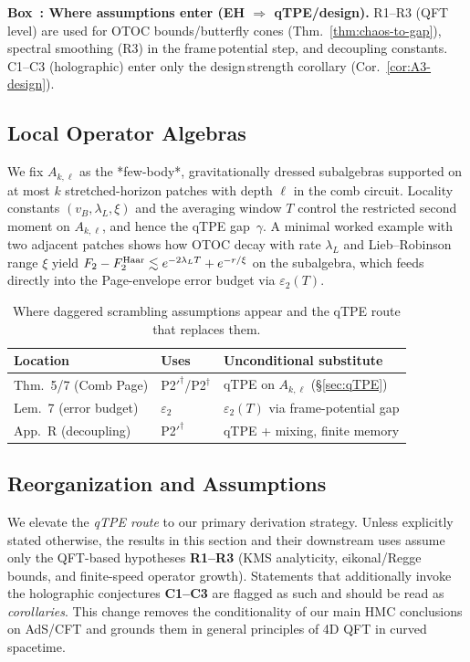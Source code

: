 \documentclass[aps,prd,preprint,onecolumn,superscriptaddress,nofootinbib,longbibliography,floatfix,11pt,showpacs,showkeys]{revtex4-2}
\newcounter{boxedresult}
\newenvironment{boxedresult}[1]{\refstepcounter{boxedresult}\begin{infobox}\noindent\textbf{Box~\theboxedresult: #1.}}{\end{infobox}}
\theoremstyle{plain}
\theoremstyle{definition}
\theoremstyle{remark}
\begin{document}
\begin{boxedresult}{Where assumptions enter (EH $\Rightarrow$ qTPE/design)}\small
R1--R3 (QFT\,level) are used for OTOC bounds/butterfly cones (Thm.~\ref{thm:chaos-to-gap}), spectral smoothing (R3) in the frame\,potential step, and decoupling constants. C1--C3 (holographic) enter only the design\,strength corollary (Cor.~\ref{cor:A3-design}).
\end{boxedresult}

\subsection{Local Operator Algebras}
We fix $A_{k,\ell}$ as the *few-body*, gravitationally dressed subalgebras supported on at
most $k$ stretched-horizon patches with depth $\ell$ in the comb circuit. Locality constants
$(v_B,\lambda_L,\xi)$ and the averaging window $T$ control the restricted second moment on
$A_{k,\ell}$, and hence the qTPE gap~$\gamma$. A minimal worked example with two adjacent
patches shows how OTOC decay with rate $\lambda_L$ and Lieb–Robinson range $\xi$ yield
$F_2- F^{\rm Haar}_2 \lesssim e^{-2\lambda_L T}+e^{-r/\xi}$ on the subalgebra, which feeds
directly into the Page-envelope error budget via $\varepsilon_2(T)$.

\begin{table}[t]
  \centering
  \small
  \begin{tabular}{l l l}
    \hline
    Location & Uses & Unconditional substitute \\
    \hline
    Thm.~5/7 (Comb Page) & P2$'^{\dagger}$/P2$^{\dagger}$ & qTPE on $A_{k,\ell}$ (\S\ref{sec:qTPE}) \\
    Lem.~7 (error budget) & $\varepsilon_2$ & $\varepsilon_2(T)$ via frame-potential gap \\
    App.~R (decoupling) & P2$'^{\dagger}$ & qTPE + mixing, finite memory \\
    \hline
  \end{tabular}
  \caption{Where daggered scrambling assumptions appear and the qTPE route that replaces them.}
  \label{tab:dagger-map}
\end{table}

\subsection{Reorganization and Assumptions}
We elevate the \emph{qTPE route} to our primary derivation strategy.
Unless explicitly stated otherwise, the results in this section and their downstream uses assume only the QFT-based hypotheses \textbf{R1--R3} (KMS analyticity, eikonal/Regge bounds, and finite-speed operator growth).
Statements that additionally invoke the holographic conjectures \textbf{C1--C3} are flagged as such and should be read as \emph{corollaries}.
This change removes the conditionality of our main HMC conclusions on AdS/CFT and grounds them in general principles of 4D QFT in curved spacetime.
\end{document}
